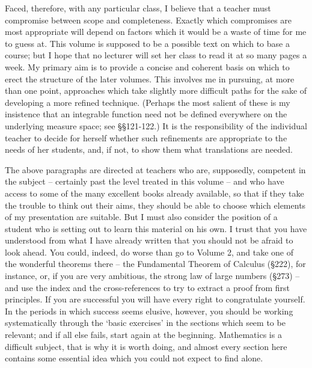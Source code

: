 Faced, therefore, with any particular class, I believe that a teacher
must compromise between scope and completeness.   Exactly which
compromises are most appropriate will depend on factors
which it would be a waste of time for me to guess at.   This volume is
supposed
to be a possible text on which to base a course;  but I hope that no
lecturer will set her class to read it at so many pages a week.   My
primary aim is to provide a concise and coherent basis on which to erect
the structure of the later volumes.   This involves me in pursuing, at
more than one point, approaches which take slightly more difficult paths
for the sake of developing a more refined technique.   (Perhaps the most
salient of these is my insistence that an integrable function need not
be defined everywhere on the underlying measure space;  see
\S\S121-122.)
It is the responsibility of the individual teacher to decide for herself
whether such refinements are appropriate to the needs of her students,
and, if not, to show them what translations are needed.

The above paragraphs are directed at teachers who are, supposedly,
competent in the subject -- certainly past the level treated in this
volume -- and who have access to some of the many excellent books
already available, so that if they take the trouble to think out their
aims, they should be able to choose which elements of my presentation
are suitable.   But I must also consider the position of a student who
is setting out to learn this material on his own.   I trust that you
have understood from what I have already written that you should not be
afraid to look ahead.   You could, indeed, do worse than go to Volume 2,
and take one of the
wonderful theorems there -- the Fundamental Theorem of Calculus
(\S222), for instance, or, if you are very ambitious, the strong
law of large numbers (\S273) -- and use the index and the
cross-references to try to extract a proof from first principles.   If
you are successful you
will have every right to congratulate yourself.   In the periods in
which success seems elusive, however, you should be working
systematically through the `basic exercises' in the sections which
seem to be
relevant;  and if all else fails, start again at the beginning.
Mathematics is a difficult subject, that is why it is worth doing, and
almost every section here contains some essential idea which you could
not expect to find alone.

\frnewpage
